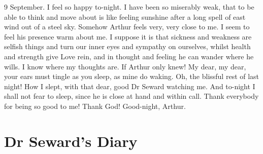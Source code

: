 \begin{diary}{9 September.}
I feel so happy to-night. I have been so miserably weak, that to be able to think and move about is like feeling sunshine after a long spell of east wind out of a steel sky. Somehow Arthur feels very, very close to me. I seem to feel his presence warm about me. I suppose it is that sickness and weakness are selfish things and turn our inner eyes and sympathy on ourselves, whilst health and strength give Love rein, and in thought and feeling he can wander where he wills. I know where my thoughts are. If Arthur only knew! My dear, my dear, your ears must tingle as you sleep, as mine do waking. Oh, the blissful rest of last night! How I slept, with that dear, good Dr Seward watching me. And to-night I shall not fear to sleep, since he is close at hand and within call. Thank everybody for being so good to me! Thank God! Good-night, Arthur.
\end{diary}


\section{Dr Seward's Diary}


